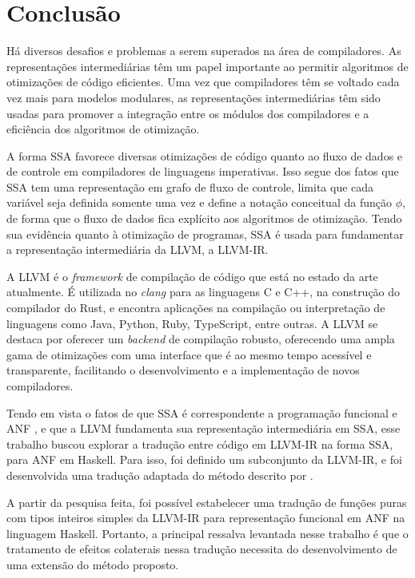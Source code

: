 
\chapter{Conclusão}\label{cap:conclusao}

Há diversos desafios e problemas a serem superados na área de compiladores. As representações intermediárias têm um papel importante ao permitir algoritmos de otimizações de código eficientes. Uma vez que compiladores têm se voltado cada vez mais para modelos modulares, as representações intermediárias têm sido usadas para promover a integração entre os módulos dos compiladores e a eficiência dos algoritmos de otimização.

A forma SSA favorece diversas otimizações de código quanto ao fluxo de dados e de controle em compiladores de linguagens imperativas. Isso segue dos fatos que SSA tem uma representação em grafo de fluxo de controle, limita que cada variável seja definida somente uma vez e define a notação conceitual da função $\phi$, de forma que o fluxo de dados fica explícito aos algoritmos de otimização. Tendo sua evidência quanto à otimização de programas, SSA é usada para fundamentar a representação intermediária da LLVM, a LLVM-IR.

A LLVM é o \emph{framework} de compilação de código que está no estado da arte atualmente. É utilizada no \emph{clang} para as linguagens C e C++, na construção do compilador do Rust, e encontra aplicações na compilação ou interpretação de linguagens como Java, Python, Ruby, TypeScript, entre outras. A LLVM se destaca por oferecer um \emph{backend} de compilação robusto, oferecendo uma ampla gama de otimizações com uma interface que é ao mesmo tempo acessível e transparente, facilitando o desenvolvimento e a implementação de novos compiladores.

Tendo em vista o fatos de que SSA é correspondente a programação funcional \cite{kelsey1995correspondence} e ANF \cite{ssaToAnf}, e que a LLVM fundamenta sua representação intermediária em SSA, esse trabalho buscou explorar a tradução entre código em LLVM-IR na forma SSA, para ANF em Haskell. Para isso, foi definido um subconjunto da LLVM-IR, e foi desenvolvida uma tradução adaptada do método descrito por . 

A partir da pesquisa feita, foi possível estabelecer uma tradução de funções puras com tipos inteiros simples da LLVM-IR para representação funcional em ANF na linguagem Haskell. Portanto, a principal ressalva levantada nesse trabalho é que o tratamento de efeitos colaterais nessa tradução necessita do desenvolvimento de uma extensão do método proposto.

